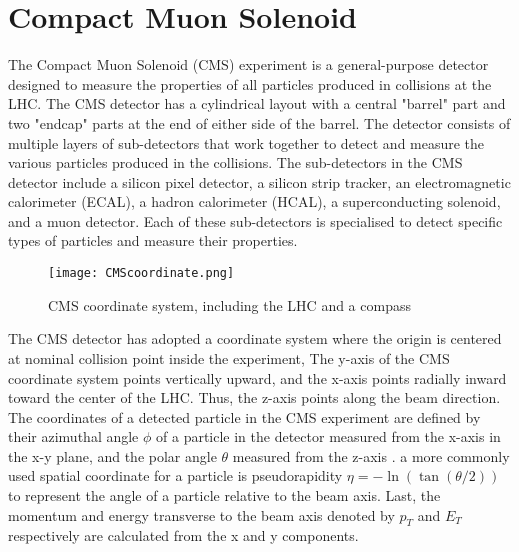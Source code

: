\section*{Compact Muon Solenoid}

The Compact Muon Solenoid (CMS) experiment is a general-purpose detector designed to measure the properties of all particles produced in collisions at the LHC. The CMS detector has a cylindrical layout with a central "barrel" part and two "endcap" parts at the end of either side of the barrel. The detector consists of multiple layers of sub-detectors that work together to detect and measure the various particles produced in the collisions. The sub-detectors in the CMS detector include a silicon pixel detector, a silicon strip tracker, an electromagnetic calorimeter (ECAL), a hadron calorimeter (HCAL), a superconducting solenoid, and a muon detector. Each of these sub-detectors is specialised to detect specific types of particles and measure their properties.\\
\begin{wrapfigure}{r}{0.53\textwidth}
    \texttt{[image: CMScoordinate.png]}
    \caption{CMS coordinate system, including the LHC and a compass\cite{TikZ}}
    \label{Fig:CMScoordinates}
\end{wrapfigure}
The CMS detector has adopted a coordinate system where the origin is centered at  nominal collision point
inside the experiment, The y-axis of the CMS coordinate system points vertically upward, and the x-axis points radially inward toward the center of the LHC. Thus, the z-axis points along the beam direction. The coordinates of a detected particle in the CMS experiment are defined by their azimuthal angle $\phi$ of a particle in the detector measured from the x-axis in the x-y plane, and the polar angle $\theta$ measured from the z-axis \cite{TheCMSCollaboration_2008}. a more commonly used spatial coordinate for a particle is pseudorapidity $\eta = -\ln(\tan(\theta/2))$ to represent the angle of a particle relative to the beam axis. Last, the momentum and energy transverse to the beam axis denoted by $p_T$ and $E_T$ respectively are calculated from the x and y components.

